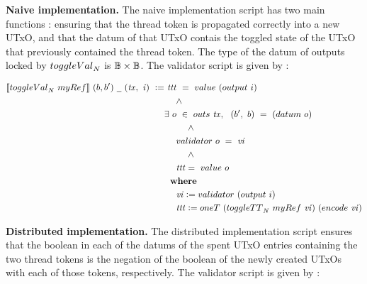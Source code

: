 \textbf{Naive implementation. }
The naive implementation script has two main functions : ensuring that the thread
token is propagated correctly into a new UTxO, and that the datum of that UTxO
contais the toggled state of the UTxO that previously contained the thread token.
The type of the datum of outputs locked by $\toggleVal_N$
is $\mathbb{B} \times \mathbb{B}$. The validator script is given by :

  \begin{align*}
    \applyScript{\toggleVal_N~\mathsf{myRef}}~(b, b')~\wcard~(\var{tx},~\var{i})~\leteq &~
    \var{ttt}~ =~ \val~(\fun{output}~i) \\
    & ~~~~ \wedge~ \\
    & \exists~o~\in~\outputs~\var{tx},~~(b',~b)~=~(\datum~o) \\
    &  ~~~~~~~~ \wedge~~\\
    & ~~~~\validator~o~=~\var{vi} \\
    &  ~~~~~~~~ \wedge \\
    & ~~~~ \var{ttt} =~\val~o\\
    & \where \\
    & ~~~~\var{vi} \leteq \validator~(\fun{output}~i) \\
    & ~~~~\var{ttt} \leteq \mathsf{oneT}~(\toggleTT_N~\mathsf{myRef}~\var{vi} )~(\fun{encode}~\var{vi})
  \end{align*}

\textbf{Distributed implementation. }
The distributed implementation script ensures that the boolean in each of the
datums of the spent UTxO entries containing the two thread tokens
is the negation of the boolean of the newly created UTxOs with each of those tokens,
respectively. The validator script is given by :

